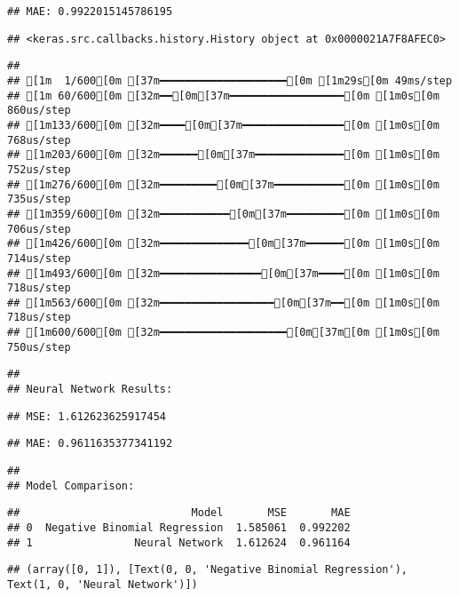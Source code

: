 \documentclass[
]{article}
\begin{document}
\begin{verbatim}
## MAE: 0.9922015145786195
\end{verbatim}

\begin{verbatim}
## <keras.src.callbacks.history.History object at 0x0000021A7F8AFEC0>
\end{verbatim}

\begin{verbatim}
## 
## [1m  1/600[0m [37m━━━━━━━━━━━━━━━━━━━━[0m [1m29s[0m 49ms/step
## [1m 60/600[0m [32m━━[0m[37m━━━━━━━━━━━━━━━━━━[0m [1m0s[0m 860us/step
## [1m133/600[0m [32m━━━━[0m[37m━━━━━━━━━━━━━━━━[0m [1m0s[0m 768us/step
## [1m203/600[0m [32m━━━━━━[0m[37m━━━━━━━━━━━━━━[0m [1m0s[0m 752us/step
## [1m276/600[0m [32m━━━━━━━━━[0m[37m━━━━━━━━━━━[0m [1m0s[0m 735us/step
## [1m359/600[0m [32m━━━━━━━━━━━[0m[37m━━━━━━━━━[0m [1m0s[0m 706us/step
## [1m426/600[0m [32m━━━━━━━━━━━━━━[0m[37m━━━━━━[0m [1m0s[0m 714us/step
## [1m493/600[0m [32m━━━━━━━━━━━━━━━━[0m[37m━━━━[0m [1m0s[0m 718us/step
## [1m563/600[0m [32m━━━━━━━━━━━━━━━━━━[0m[37m━━[0m [1m0s[0m 718us/step
## [1m600/600[0m [32m━━━━━━━━━━━━━━━━━━━━[0m[37m[0m [1m0s[0m 750us/step
\end{verbatim}

\begin{verbatim}
## 
## Neural Network Results:
\end{verbatim}

\begin{verbatim}
## MSE: 1.612623625917454
\end{verbatim}

\begin{verbatim}
## MAE: 0.9611635377341192
\end{verbatim}

\begin{verbatim}
## 
## Model Comparison:
\end{verbatim}

\begin{verbatim}
##                           Model       MSE       MAE
## 0  Negative Binomial Regression  1.585061  0.992202
## 1                Neural Network  1.612624  0.961164
\end{verbatim}

\begin{verbatim}
## (array([0, 1]), [Text(0, 0, 'Negative Binomial Regression'), Text(1, 0, 'Neural Network')])
\end{verbatim}
\end{document}
